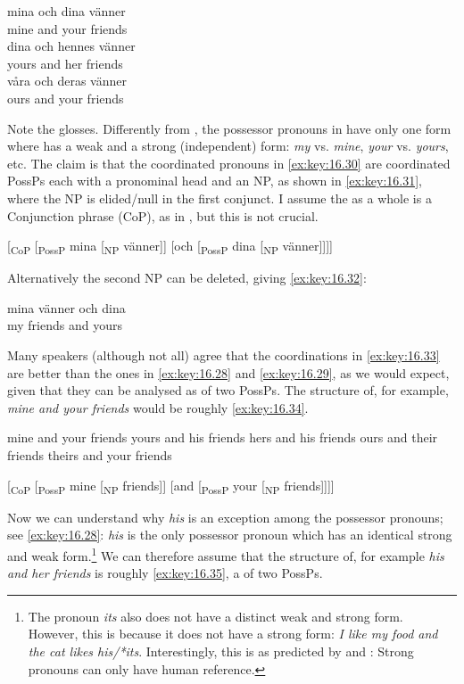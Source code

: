 \documentclass[output=paper]{langsci/langscibook}
\begin{document}
\ea\label{ex:key:16.30}
	\ea
		\gll mina och dina vänner\\
			mine   and  your friends\\
	\ex
		\gll dina och hennes vänner\\
			yours and her friends\\
	\ex
		\gll våra och deras vänner\\
			ours and your friends\\
	\z
\z

Note the glosses. Differently from , the possessor pronouns in 
have only one form where  has a weak and a strong (independent) form:
\emph{my} vs. \emph{mine}, \emph{your} vs. \emph{yours}, etc. The claim is that
the  coordinated pronouns in \eqref{ex:key:16.30} are coordinated PossPs
each with a pronominal head and an NP, as shown in \eqref{ex:key:16.31}, where
the NP is elided/null in the first conjunct. I assume the  as a
whole is a Conjunction phrase (CoP), as in \citet{Johannessen1998}, but this is
not crucial.

\ea\label{ex:key:16.31}
    {}[\textsubscript{CoP} [\textsubscript{PossP} mina [\textsubscript{NP} vänner]] [och [\textsubscript{PossP} dina [\textsubscript{NP} vänner]]]]
\z\newpage

Alternatively the second NP can be deleted, giving \eqref{ex:key:16.32}:

\ea\label{ex:key:16.32}
    \sn
	\gll mina vänner och dina\\
		my friends    and yours\\
\z

Many speakers (although not all) agree that the  coordinations in \eqref{ex:key:16.33}
are better than the ones in \eqref{ex:key:16.28} and \eqref{ex:key:16.29}, as we would expect, given that they
can be analysed as  of two PossPs. The structure of, for example,
\emph{mine and your friends} would be roughly \eqref{ex:key:16.34}.

\ea\label{ex:key:16.33}
	\ea mine and your friends
	\ex yours and his friends
	\ex hers and his friends
	\ex ours and their friends
	\ex theirs and your friends
	\z
\z

\ea\label{ex:key:16.34}
    {}[\textsubscript{CoP} [\textsubscript{PossP} mine [\textsubscript{NP} friends]] [and [\textsubscript{PossP} your [\textsubscript{NP} friends]]]]
\z

Now we can understand why \emph{his} is an exception among the possessor
pronouns; see \eqref{ex:key:16.28}: \emph{his} is the only possessor pronoun which has an
identical strong and weak form.\footnote{ The pronoun \emph{its} also does not
have a distinct weak and strong form. However, this is because it does not have
a strong form: \emph{I like my food and the cat likes his/*its}. Interestingly,
this is as predicted by \citet{Cardinaletti1998} and \citet{CarSta1999}: Strong
pronouns can only have human reference.} We can therefore assume that the
structure of, for example \emph{his and her friends} is roughly
\eqref{ex:key:16.35}, a  of two PossPs.
\end{document}
